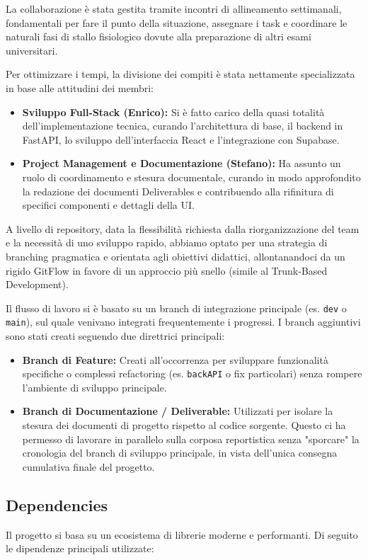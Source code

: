 La collaborazione è stata gestita tramite incontri di allineamento settimanali, fondamentali per fare il punto della situazione, assegnare i task e coordinare le naturali fasi di stallo fisiologico dovute alla preparazione di altri esami universitari.

Per ottimizzare i tempi, la divisione dei compiti è stata nettamente specializzata in base alle attitudini dei membri:
\begin{itemize}
    \item \textbf{Sviluppo Full-Stack (Enrico):} Si è fatto carico della quasi totalità dell'implementazione tecnica, curando l'architettura di base, il backend in FastAPI, lo sviluppo dell'interfaccia React e l'integrazione con Supabase.
    \item \textbf{Project Management e Documentazione (Stefano):} Ha assunto un ruolo di coordinamento e stesura documentale, curando in modo approfondito la redazione dei documenti Deliverables e contribuendo alla rifinitura di specifici componenti e dettagli della UI.
\end{itemize}

A livello di repository, data la flessibilità richiesta dalla riorganizzazione del team e la necessità di uno sviluppo rapido, abbiamo optato per una strategia di branching pragmatica e orientata agli obiettivi didattici, allontanandoci da un rigido GitFlow in favore di un approccio più snello (simile al Trunk-Based Development). 

Il flusso di lavoro si è basato su un branch di integrazione principale (es. \texttt{dev} o \texttt{main}), sul quale venivano integrati frequentemente i progressi. I branch aggiuntivi sono stati creati seguendo due direttrici principali:
\begin{itemize}
    \item \textbf{Branch di Feature:} Creati all'occorrenza per sviluppare funzionalità specifiche o complessi refactoring (es. \texttt{backAPI} o fix particolari) senza rompere l'ambiente di sviluppo principale.
    \item \textbf{Branch di Documentazione / Deliverable:} Utilizzati per isolare la stesura dei documenti di progetto rispetto al codice sorgente. Questo ci ha permesso di lavorare in parallelo sulla corposa reportistica senza "sporcare" la cronologia del branch di sviluppo principale, in vista dell'unica consegna cumulativa finale del progetto.
\end{itemize}

\subsection{Dependencies}
Il progetto si basa su un ecosistema di librerie moderne e performanti. Di seguito le dipendenze principali utilizzate:

